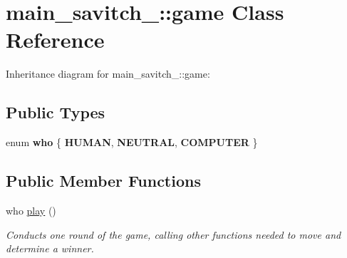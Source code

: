 \hypertarget{classmain__savitch__14_1_1game}{}\section{main\+\_\+savitch\+\_\+:\+:game Class Reference}
\label{classmain__savitch__14_1_1game}


Inheritance diagram for main\+\_\+savitch\+\_\+:\+:game\+:
\subsection*{Public Types}
\begin{DoxyCompactItemize}
\item 
enum {\bfseries who} \{ {\bfseries H\+U\+M\+AN}, 
{\bfseries N\+E\+U\+T\+R\+AL}, 
{\bfseries C\+O\+M\+P\+U\+T\+ER}
 \}\hypertarget{classmain__savitch__14_1_1game_a4fe20fb287f809ae2b68e28e4ccba634}{}\label{classmain__savitch__14_1_1game_a4fe20fb287f809ae2b68e28e4ccba634}

\end{DoxyCompactItemize}
\subsection*{Public Member Functions}
\begin{DoxyCompactItemize}
\item 
who \hyperlink{classmain__savitch__14_1_1game_a4dbeaddb78059f7c5dcbf5cc4e026317}{play} ()\hypertarget{classmain__savitch__14_1_1game_a4dbeaddb78059f7c5dcbf5cc4e026317}{}\label{classmain__savitch__14_1_1game_a4dbeaddb78059f7c5dcbf5cc4e026317}

\begin{DoxyCompactList}\small\item\em Conducts one round of the game, calling other functions needed to move and determine a winner. \end{DoxyCompactList}\end{DoxyCompactItemize}
